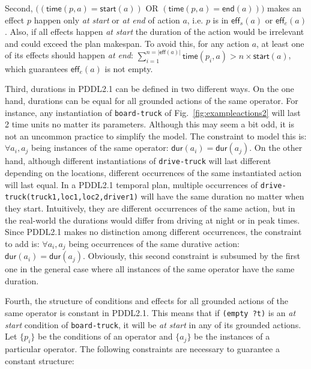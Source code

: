 \documentclass[10pt,journal,compsoc]{IEEEtran}
\newcommand{\eff}{\mathsf{eff}}    %
\newcommand{\dur}{\mathsf{dur}}    %
\newcommand{\start}{\mathsf{start}}%
\newcommand{\en}{\mathsf{end}}     %
\newcommand{\tim}{\mathsf{time}}   %
\begin{document}
Second, $((\tim(p,a) = \start(a))$ OR $(\tim(p,a) = \en(a)))$ makes an effect $p$ happen only \emph{at start} or \emph{at end} of action $a$, i.e. $p$ is in $\eff_s(a)$ or $\eff_e(a)$.
Also, if all effects happen \emph{at start} the duration of the action would be irrelevant and could exceed the plan makespan. To avoid this, for any action $a$, at least one of its effects should happen \emph{at end}: $\sum_{i=1}^{n =|\eff(a)|} \tim(p_i,a) > n \times \start(a)$, which guarantees $\eff_e(a)$ is not empty.



Third, durations in PDDL2.1 can be defined in two different ways. On the one hand, durations can be equal for all grounded actions of the same operator. For instance, any instantiation of \texttt{board-truck} of Fig.~\ref{fig:exampleactions2} will last 2 time units no matter its parameters. Although this may seem a bit odd, it is not an uncommon practice to simplify the model. The constraint to model this is: $\forall a_i,a_j$ being instances of the same operator: $\dur(a_i) = \dur(a_j)$.
On the other hand, although different instantiations of \texttt{drive-truck} will last different depending on the locations, different occurrences of the same instantiated action will last equal.
In a PDDL2.1 temporal plan, multiple occurrences of \texttt{drive-truck(truck1,loc1,loc2,driver1)} will have the same duration no matter when they start. Intuitively, they are different occurrences of the same action, but in the real-world the durations would differ from driving at night or in peak times. Since PDDL2.1 makes no distinction among different occurrences, the constraint to add is: $\forall a_i,a_j$ being occurrences of the same durative action: $\dur(a_i) = \dur(a_j)$.
Obviously, this second constraint is subsumed by the first one in the general case where all instances of the same operator have the same duration.

Fourth, the structure of conditions and effects for all grounded actions of the same operator is constant in PDDL2.1. This means that if \texttt{(empty ?t)} is an \emph{at start} condition of \texttt{board-truck}, it will be \emph{at start} in any of its grounded actions.
Let $\{p_i\}$ be the conditions of an operator and $\{a_j\}$ be the instances of a particular operator. The following constraints are necessary to guarantee a constant structure:
\end{document}
